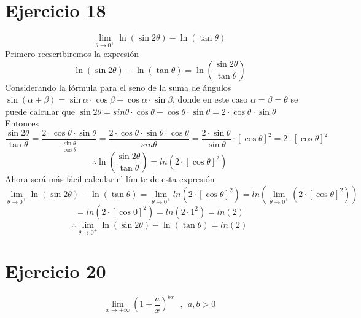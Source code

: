 \documentclass[12pt]{article}
\begin{document}
\section{Ejercicio 18}
\[
\lim_{\theta \to 0^+} \ln (\sin 2\theta) - \ln (\tan \theta)
\]
Primero reescribiremos la expresión
\[
 \ln (\sin 2\theta) - \ln (\tan \theta) = \ln ( \frac{\sin 2\theta}{\tan \theta} ) 
\]
Considerando la fórmula para el seno de la suma de ángulos $ \sin (\alpha + \beta) = \sin \alpha \cdot \cos \beta + \cos \alpha \cdot \sin \beta $, donde en este caso $\alpha = \beta = \theta$ se puede calcular que $\sin 2\theta = sin \theta \cdot \cos \theta  + \cos \theta  \cdot \sin \theta   = 2 \cdot \cos \theta  \cdot \sin \theta $ \\
Entonces 
\[
 \frac{\sin 2\theta}{\tan \theta} = \frac{ 2 \cdot \cos \theta  \cdot \sin \theta}{\frac{\sin \theta}{\cos \theta}} = \frac{2 \cdot \cos \theta  \cdot \sin \theta \cdot \cos \theta}{sin \theta} = \frac{2 \cdot \sin \theta}{\sin \theta} \cdot [\cos \theta]^{2} = 2 \cdot [\cos \theta]^{2}
\]
\[
\therefore \ln ( \frac{ \sin 2 \theta }{ \tan \theta} ) = ln ( 2 \cdot [\cos \theta]^{2} )
\]
Ahora será más fácil calcular el límite de esta expresión
\[
\lim_{\theta \to 0^+} \ln (\sin 2\theta) - \ln (\tan \theta) = \lim_{\theta \to 0^+}  ln ( 2 \cdot [\cos \theta]^{2} ) =  ln ( \lim_{\theta \to 0^+} ( 2 \cdot [\cos \theta]^{2} )) 
\]
\[
= ln (  2 \cdot [\cos 0]^{2}) =ln (  2 \cdot 1^{2})  = ln (2) 
\]
\[
\therefore \lim_{\theta \to 0^+} \ln (\sin 2\theta) - \ln (\tan \theta) =  ln (2) 
\]
\section{Ejercicio 20}
\[
\lim_{x \to + \infty} (1+\frac{a}{x})^{bx} ~ ~ ~,~ ~ a,b>0
\]

\end{document}
